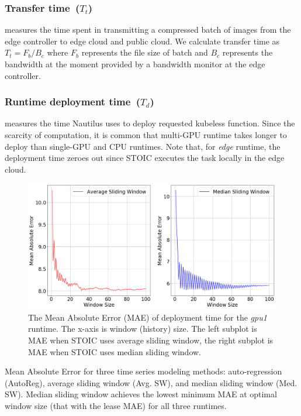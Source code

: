  \subsubsection{Transfer time~($T_t$)} measures the time spent in transmitting a compressed batch of images from the edge controller to edge cloud and public cloud. We calculate transfer time as ${T_t = F_b / B_c}$ where $F_b$ represents the file size of batch and $B_c$ represents the bandwidth at the moment provided by a bandwidth monitor at the edge controller. 
 
 \subsubsection{Runtime deployment time~($T_d$)} measures the time Nautilus uses to deploy requested kubeless function. Since the scarcity of computation, it is common that multi-GPU runtime takes longer to deploy than single-GPU and CPU runtimes. Note that, for \textit{edge} runtime, the deployment time zeroes out since STOIC executes the task locally in the edge cloud.
 
\begin{figure}
    \centering
    \includegraphics[scale=0.18]{figures/deployment}
    \caption{The Mean Absolute Error (MAE) of deployment time for the \textit{gpu1} runtime. The x-axis is window (history) size. The left subplot is MAE when STOIC uses average sliding window, the right subplot is MAE when STOIC uses median sliding window.
\label{fig:deployment}}
\end{figure}

 
\begin{table}
\centering

\caption{Mean Absolute Error for three time series modeling methods: auto-regression (AutoReg), average sliding window (Avg. SW), and median sliding window (Med. SW). Median sliding window achieves the lowest minimum MAE at optimal window size (that with the lease MAE) for all three runtimes. \label{tab:deployment}}
\end{table}
 

